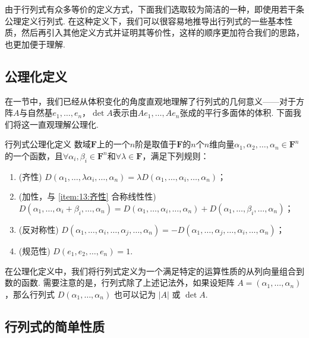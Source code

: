 由于行列式有众多等价的定义方式，下面我们选取较为简洁的一种，即使用若干条公理定义行列式. 在这种定义下，我们可以很容易地推导出行列式的一些基本性质，然后再引入其他定义方式并证明其等价性，这样的顺序更加符合我们的思路，也更加便于理解.

\subsection{公理化定义}

在一节中，我们已经从体积变化的角度直观地理解了行列式的几何意义——对于方阵$A$与自然基$e_1,\ldots,e_n$，$\det A$表示由$Ae_1,\ldots,Ae_n$张成的平行多面体的体积. 下面我们将这一直观理解公理化.

\begin{definition}{行列式}{公理化定义}
    数域$\mathbf{F}$上的一个$n$阶是取值于$\mathbf{F}$的$n$个$n$维向量$\alpha_1,\alpha_2,\ldots,\alpha_n \in \mathbf{F}^n$的一个函数，且$\forall \alpha_i,\beta_i \in \mathbf{F}^n$和$\forall \lambda \in \mathbf{F}$，满足下列规则：
    \begin{enumerate}
        \item \label{item:13:齐性}
              (齐性) $D(\alpha_1,\ldots,\lambda\alpha_i,\ldots,\alpha_n)=\lambda D(\alpha_1,\ldots,\alpha_i,\ldots,\alpha_n)$；

        \item \label{item:13:加性}
              (加性，与 \ref*{item:13:齐性} 合称线性性) \\
              $D(\alpha_1,\ldots,\alpha_i+\beta_i,\ldots,\alpha_n)=D(\alpha_1,\ldots,\alpha_i,\ldots,\alpha_n)+D(\alpha_1,\ldots,\beta_i,\ldots,\alpha_n)$；

        \item \label{item:13:反对称性}
              (反对称性) $D(\alpha_1,\ldots,\alpha_i,\ldots,\alpha_j,\ldots,\alpha_n)=-D(\alpha_1,\ldots,\alpha_j,\ldots,\alpha_i,\ldots,\alpha_n)$；

        \item \label{item:13:规范性}
              (规范性) $D(e_1,e_2,\ldots,e_n)=1$.
    \end{enumerate}
\end{definition}

在公理化定义中，我们将行列式定义为一个满足特定的运算性质的从列向量组合到数的函数. 需要注意的是，行列式除了上述记法外，如果设矩阵 $A = (\alpha_1,\ldots,\alpha_n)$，那么行列式 $D(\alpha_1,\ldots,\alpha_n)$ 也可以记为 $|A|$ 或 $\det A$.

\subsection{行列式的简单性质}

